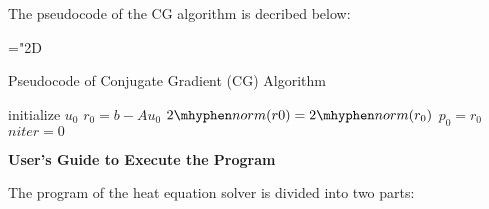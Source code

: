 \documentclass[11pt]{article} %
\begin{document}
\newpage
The pseudocode of the CG algorithm is decribed below:
\bigskip

\begin{algorithm}[H]
  \mathchardef\mhyphen="2D
  \caption{Pseudocode of Conjugate Gradient (CG) Algorithm}
  \SetAlgoLined
  initialize $u_{0}$\;
  $r_{0} = b - A u_{0}$\;
  $2\mhyphen norm(r0) = 2\mhyphen norm(r_{0})$\;
  $p_{0} = r_{0}$\;
  $niter = 0$\;

\end{algorithm}

\bigskip
\noindent
\textbf{\Large{User's Guide to Execute the Program}}

\bigskip
The program of the heat equation solver is divided into two parts:
\end{document}
